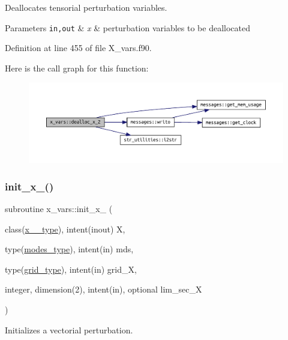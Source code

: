 Deallocates tensorial perturbation variables. 


\begin{DoxyParams}[1]{Parameters}
\mbox{\tt in,out}  & {\em x} & perturbation variables to be deallocated \\
\hline
\end{DoxyParams}


Definition at line 455 of file X\+\_\+vars.\+f90.

Here is the call graph for this function\+:\nopagebreak
\begin{figure}[H]
\begin{center}
\leavevmode
\includegraphics[width=350pt]{namespacex__vars_ac052defbe764e6d02f436bd29d72db6d_cgraph}
\end{center}
\end{figure}
\mbox{\label{namespacex__vars_a327c74a0fa8c50aa2ed812062bd82436}} 
\subsubsection{\texorpdfstring{init\+\_\+x\+\_()}{init\_x\_1()}}
{\footnotesize\ttfamily subroutine x\+\_\+vars\+::init\+\_\+x\+\_ (\begin{DoxyParamCaption}\item[{class(\hyperlink{structx__vars_1_1x__1__type}{x\+\_\+1\+\_\+type}), intent(inout)}]{X,  }\item[{type(\hyperlink{structx__vars_1_1modes__type}{modes\+\_\+type}), intent(in)}]{mds,  }\item[{type(\hyperlink{structgrid__vars_1_1grid__type}{grid\+\_\+type}), intent(in)}]{grid\+\_\+X,  }\item[{integer, dimension(2), intent(in), optional}]{lim\+\_\+sec\+\_\+X }\end{DoxyParamCaption})}



Initializes a vectorial perturbation. 

